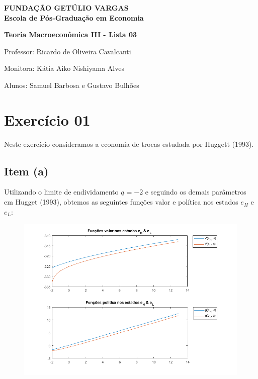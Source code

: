 \documentclass{article}
\begin{document}
\begin{flushleft}

\textbf{FUNDAÇÃO GETÚLIO VARGAS} \\



\textbf{Escola de Pós-Graduação em Economia}



\textbf{Teoria Macroeconômica III - Lista 03}



Professor: Ricardo de Oliveira Cavalcanti



Monitora: Kátia Aiko Nishiyama Alves



Alunos: Samuel Barbosa e Gustavo Bulhões

\end{flushleft}



\section*{Exercício 01}

Neste exercício consideramos a economia de trocas estudada por Huggett (1993).



\subsection*{Item (a)}

Utilizando o limite de endividamento $\underline{a} = -2$ e seguindo os demais parâmetros em Hugget (1993), obtemos as seguintes funções valor e política nos estados $e_H$ e $e_L$:



\begin{figure}[!h]

\includegraphics[scale=0.6]{ex1/ex1_1.png}

\end{figure}
\end{document}
